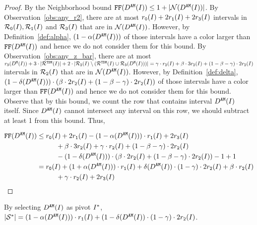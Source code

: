 {\begin{proof}
    By the Neighborhood bound $\text{\texttt{FF}}(D^\texttt{AM}(I)) \leq 1 + |\mathcal{N}(D^\texttt{AM}(I))|$.
    By Observation~\ref{obs:any_r2}, there are at most $r_\texttt{0}(I) + 2r_\texttt{1}(I) + 2r_\texttt{3}(I)$ intervals in $\mathcal{R}_\texttt{0}(I), \mathcal{R}_\texttt{1}(I)$ and $\mathcal{R}_\texttt{3}(I)$ that are in $\mathcal{N}(D^\texttt{AM}(I))$.
    However, by Definition~\ref{def:alpha}, $(1 - \alpha(D^\texttt{AM}(I)))$ of those intervals have a color larger than $\text{\texttt{FF}}(D^\texttt{AM}(I))$ and hence we do not consider them for this bound.
    By Observation~\ref{obs:any_z_bar}, there are at most $r_\texttt{3}(D^\texttt{M}(I)) + 3\cdot|\mathcal{R}^{\texttt{TDM}}(I)| + 2\cdot|\mathcal{R}_\texttt{2}(I)\setminus(\mathcal{R}^{\texttt{TDM}}(I)\cup\mathcal{R}_\texttt{3}(D^\texttt{M}(I)))| = \gamma \cdot r_\texttt{2}(I) + \beta \cdot 3r_\texttt{2}(I) + (1 - \beta - \gamma) \cdot 2r_\texttt{2}(I)$ intervals in $\mathcal{R}_\texttt{2}(I)$ that are in $\mathcal{N}(D^\texttt{AM}(I))$.
    However, by Definition~\ref{def:delta}, $(1 - \delta(D^\texttt{AM}(I))) \cdot (\beta \cdot 2r_\texttt{2}(I) + (1 - \beta - \gamma) \cdot 2r_\texttt{2}(I))$ of those intervals have a color larger than $\text{\texttt{FF}}(D^\texttt{AM}(I))$ and hence we do not consider them for this bound.
    Observe that by this bound, we count the row that contains interval $D^\texttt{AM}(I)$ itself.
    Since $D^\texttt{AM}(I)$ cannot intersect any interval on this row, we should subtract at least 1 from this bound.
    Thus,

    \begin{align*}
            \text{\texttt{FF}}(D^\texttt{AM}(I)) &\leq r_\texttt{0}(I) + 2r_\texttt{1}(I) - (1 - \alpha(D^\texttt{AM}(I))) \cdot r_\texttt{1}(I) + 2r_\texttt{3}(I)  
            \\ &\hspace{1cm} + \beta  \cdot 3r_\texttt{2}(I) + \gamma  \cdot r_\texttt{2}(I) + (1 - \beta  - \gamma ) \cdot 2r_\texttt{2}(I)
            \\ &\hspace{1cm} - (1 - \delta(D^\texttt{AM}(I))) \cdot \left( \beta  \cdot 2r_\texttt{2}(I) + (1 - \beta  - \gamma ) \cdot 2r_\texttt{2}(I) \right) -1 + 1\\
            &= r_\texttt{0}(I) + (1 + \alpha(D^\texttt{AM}(I))) \cdot r_\texttt{1}(I) + \delta(D^\texttt{AM}(I)) \cdot (1 - \gamma ) \cdot 2r_\texttt{2}(I) + \beta  \cdot r_\texttt{2}(I) \\&\hspace{1cm} + \gamma  \cdot r_\texttt{2}(I) + 2r_\texttt{3}(I)
        \end{align*}
\end{proof}

\medskip


\begin{lemma}
    \label{lem:pivotset_zbar}
    By selecting $D^\texttt{AM}(I)$ as pivot $I^*$, $|\mathcal{S}^*| = (1-\alpha(D^\texttt{AM}(I))) \cdot r_\texttt{1}(I) + (1 - \delta(D^\texttt{AM}(I)) \cdot (1 - \gamma) \cdot 2r_\texttt{2}(I)$.
\end{lemma}

}
